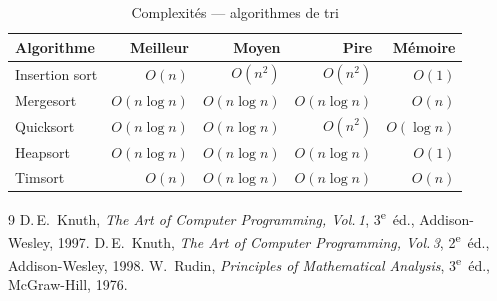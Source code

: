 \documentclass[11pt, a4paper, twoside]{article}
\newcommand{\1}{\mathbf{1}}
\newenvironment{chartable}[3]{%
  \begin{table}[htbp]\caption{#2}\label{#3}\centering\small\begin{tabular}{#1}\toprule
}{%
  \bottomrule\end{tabular}\end{table}
}
\begin{document}
\begin{chartable}{lrrrr}{Complexités — algorithmes de tri}{tab:tri}
  \textbf{Algorithme} & \textbf{Meilleur} & \textbf{Moyen}
    & \textbf{Pire} & \textbf{Mémoire} \\
  \midrule
  Insertion sort & $O(n)$ & $O(n^2)$ & $O(n^2)$ & $O(1)$ \\
  Mergesort & $O(n\log n)$ & $O(n\log n)$ & $O(n\log n)$ & $O(n)$ \\
  Quicksort & $O(n\log n)$ & $O(n\log n)$ & $O(n^2)$ & $O(\log n)$ \\
  Heapsort & $O(n\log n)$ & $O(n\log n)$ & $O(n\log n)$ & $O(1)$ \\
  Timsort & $O(n)$ & $O(n\log n)$ & $O(n\log n)$ & $O(n)$ \\
\end{chartable}

\begin{thebibliography}{9}
    D.\,E.~Knuth, \textit{The Art of Computer Programming, Vol.\,1},
    3\textsuperscript{e}~éd., Addison-Wesley, 1997.
    D.\,E.~Knuth, \textit{The Art of Computer Programming, Vol.\,3},
    2\textsuperscript{e}~éd., Addison-Wesley, 1998.
    W.~Rudin, \textit{Principles of Mathematical Analysis},
    3\textsuperscript{e}~éd., McGraw-Hill, 1976.
\end{thebibliography}
\end{document}
